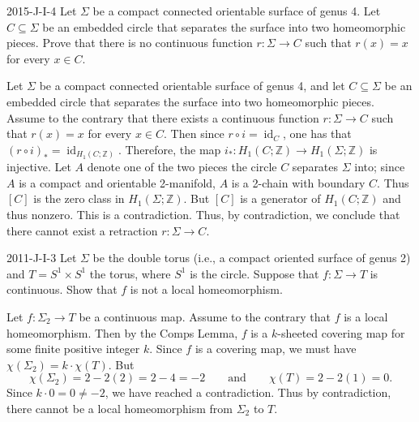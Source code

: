 \documentclass{article}
\begin{document}
	\begin{prb}{2015-J-I-4}
		Let $\Sigma$ be a compact connected orientable surface of genus 4. Let $C \subseteq \Sigma$ be an embedded circle that separates the surface into two homeomorphic pieces. Prove that there is no continuous function $r: \Sigma \to C$ such that $r(x) = x$ for every $x \in C$. 
	\end{prb}
	Let $\Sigma$ be a compact connected orientable surface of genus 4, and let $C \subseteq \Sigma$ be an embedded circle that separates the surface into two homeomorphic pieces. Assume to the contrary that there exists a continuous function $r: \Sigma \to C$ such that $r(x) = x$ for every $x\in C$. Then since $r \circ i = \operatorname{id}_{C}$, one has that $(r \circ i)_\ast = \operatorname{id}_{H_{1}(C;\mathbb{Z})}$. Therefore, the map $i_\ast: H_1(C;\mathbb{Z}) \to H_1(\Sigma; \mathbb{Z})$ is injective. Let $A$ denote one of the two pieces the circle $C$ separates $\Sigma$ into; since $A$ is a compact and orientable 2-manifold, $A$ is a 2-chain with boundary $C$. Thus $[C]$ is the zero class in $H_1(\Sigma;\mathbb{Z})$. But $[C]$ is a generator of $H_1(C;\mathbb{Z})$ and thus nonzero. This is a contradiction. Thus, by contradiction, we conclude that there cannot exist a retraction $r: \Sigma \to C$. 
	
	\begin{prb}{2011-J-I-3}
		Let $\Sigma$ be the double torus (i.e., a compact oriented surface of genus 2) and $T = S^{1} \times S^{1}$ the torus, where $S^{1}$ is the circle. Suppose that $f: \Sigma \to T$ is continuous. Show that $f$ is not a local homeomorphism. 
	\end{prb}
	
	Let $f: \Sigma_{2} \to T$ be a continuous map. Assume to the contrary that $f$ is a local homeomorphism. Then by the Comps Lemma, $f$ is a $k$-sheeted covering map for some finite positive integer $k$. Since $f$ is a covering map, we must have $\chi(\Sigma_{2}) = k \cdot \chi(T)$. But 
	\begin{equation*}
		\chi(\Sigma_{2}) = 2 - 2(2) = 2-4 = -2 \qquad \text{and} \qquad \chi(T) = 2 - 2(1) = 0. 
	\end{equation*}
	Since $k \cdot 0= 0 \neq -2$, we have reached a contradiction. Thus by contradiction, there cannot be a local homeomorphism from $\Sigma_{2}$ to $T$. 
	
\end{document}
